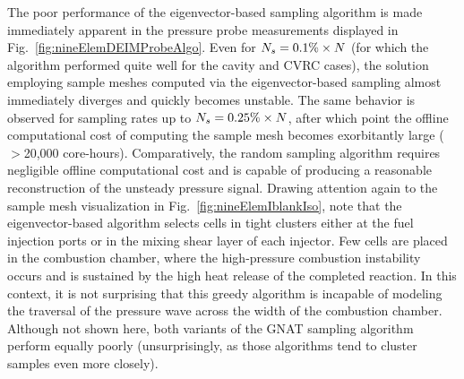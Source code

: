 The poor performance of the eigenvector-based sampling algorithm is made immediately apparent in the pressure probe measurements displayed in Fig.~\ref{fig:nineElemDEIMProbeAlgo}. Even for $N_s = 0.1\% \times N$ (for which the algorithm performed quite well for the cavity and CVRC cases), the solution employing sample meshes computed via the eigenvector-based sampling almost immediately diverges and quickly becomes unstable. The same behavior is observed for sampling rates up to $N_s = 0.25\% \times N$, after which point the offline computational cost of computing the sample mesh becomes exorbitantly large ($>$20,000 core-hours). Comparatively, the random sampling algorithm requires negligible offline computational cost and is capable of producing a reasonable reconstruction of the unsteady pressure signal. Drawing attention again to the sample mesh visualization in Fig.~\ref{fig:nineElemIblankIso}, note that the eigenvector-based algorithm selects cells in tight clusters either at the fuel injection ports or in the mixing shear layer of each injector. Few cells are placed in the combustion chamber, where the high-pressure combustion instability occurs and is sustained by the high heat release of the completed reaction. In this context, it is not surprising that this greedy algorithm is incapable of modeling the traversal of the pressure wave across the width of the combustion chamber. Although not shown here, both variants of the GNAT sampling algorithm perform equally poorly (unsurprisingly, as those algorithms tend to cluster samples even more closely).  

